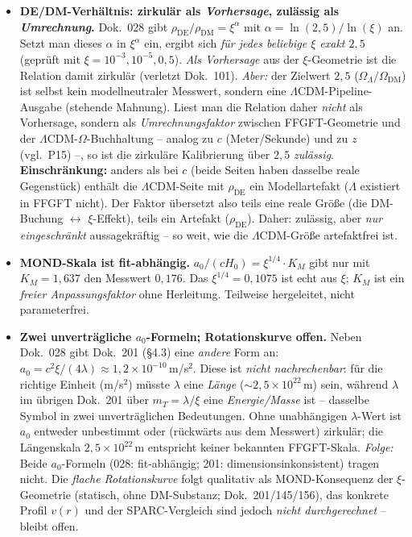 \begin{itemize}
  \item \textbf{DE/DM-Verhältnis: zirkulär als \emph{Vorhersage}, zulässig als
        \emph{Umrechnung}.} Dok.~028 gibt $\rho_{\text{DE}}/\rho_{\text{DM}} =
        \xi^{\alpha}$ mit $\alpha = \ln(2{,}5)/\ln(\xi)$ an. Setzt man dieses
        $\alpha$ in $\xi^{\alpha}$ ein, ergibt sich \emph{für jedes beliebige
        $\xi$ exakt $2{,}5$} (geprüft mit $\xi = 10^{-3}, 10^{-5}, 0{,}5$).
        \emph{Als Vorhersage} aus der $\xi$-Geometrie ist die Relation damit
        zirkulär (verletzt Dok.~101). \emph{Aber:} der Zielwert $2{,}5$
        ($\Omega_\Lambda/\Omega_{\text{DM}}$) ist selbst kein modellneutraler
        Messwert, sondern eine $\Lambda$CDM-Pipeline-Ausgabe (stehende Mahnung).
        Liest man die Relation daher \emph{nicht} als Vorhersage, sondern als
        \emph{Umrechnungsfaktor} zwischen FFGFT-Geometrie und der
        $\Lambda$CDM-$\Omega$-Buchhaltung -- analog zu $c$ (Meter/Sekunde) und
        zu $z$ (vgl.\ P15) --, so ist die zirkuläre Kalibrierung über $2{,}5$
        \emph{zulässig}. \textbf{Einschränkung:} anders als bei $c$ (beide Seiten
        haben dasselbe reale Gegenstück) enthält die $\Lambda$CDM-Seite mit
        $\rho_{\text{DE}}$ ein Modellartefakt ($\Lambda$ existiert in FFGFT
        nicht). Der Faktor übersetzt also teils eine reale Größe (die
        DM-Buchung $\leftrightarrow$ $\xi$-Effekt), teils ein Artefakt
        ($\rho_{\text{DE}}$). Daher: zulässig, aber \emph{nur eingeschränkt}
        aussagekräftig -- so weit, wie die $\Lambda$CDM-Größe artefaktfrei ist.
  \item \textbf{MOND-Skala ist fit-abhängig.} $a_0/(cH_0) = \xi^{1/4}\cdot K_M$
        gibt nur mit $K_M = 1{,}637$ den Messwert $0{,}176$. Das $\xi^{1/4} =
        0{,}1075$ ist echt aus $\xi$; $K_M$ ist ein \emph{freier
        Anpassungsfaktor} ohne Herleitung. Teilweise hergeleitet, nicht
        parameterfrei.
  \item \textbf{Zwei unverträgliche $a_0$-Formeln; Rotationskurve offen.}
        Neben Dok.~028 gibt Dok.~201 (§4.3) eine \emph{andere} Form an:
        $a_0 = c^2\xi/(4\lambda)\approx 1{,}2\times10^{-10}$\,m/s$^2$. Diese ist
        \emph{nicht nachrechenbar}: für die richtige Einheit (m/s$^2$) müsste
        $\lambda$ eine \emph{Länge} ($\sim 2{,}5\times10^{22}$\,m) sein, während
        $\lambda$ im übrigen Dok.~201 über $m_T=\lambda/\xi$ eine
        \emph{Energie/Masse} ist -- dasselbe Symbol in zwei unverträglichen
        Bedeutungen. Ohne unabhängigen $\lambda$-Wert ist $a_0$ entweder
        unbestimmt oder (rückwärts aus dem Messwert) zirkulär; die Längenskala
        $2{,}5\times10^{22}$\,m entspricht keiner bekannten FFGFT-Skala.
        \emph{Folge:} Beide $a_0$-Formeln (028: fit-abhängig; 201:
        dimensionsinkonsistent) tragen nicht. Die \emph{flache Rotationskurve}
        folgt qualitativ als MOND-Konsequenz der $\xi$-Geometrie (statisch,
        ohne DM-Substanz; Dok.~201/145/156), das konkrete Profil $v(r)$ und der
        SPARC-Vergleich sind jedoch \emph{nicht durchgerechnet} -- bleibt offen.
\end{itemize}

